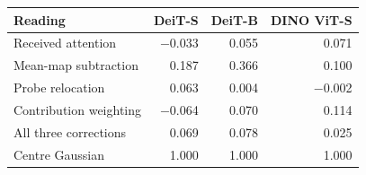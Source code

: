 \begin{tabular}{@{}lrrr@{}}
\toprule
Reading & DeiT-S & DeiT-B & DINO ViT-S\\
\midrule
Received attention & $-$0.033 & 0.055 & 0.071 \\
Mean-map subtraction & 0.187 & 0.366 & 0.100 \\
Probe relocation & 0.063 & 0.004 & $-$0.002 \\
Contribution weighting & $-$0.064 & 0.070 & 0.114 \\
All three corrections & 0.069 & 0.078 & 0.025 \\
\midrule
Centre Gaussian & 1.000 & 1.000 & 1.000 \\
\bottomrule
\end{tabular}
